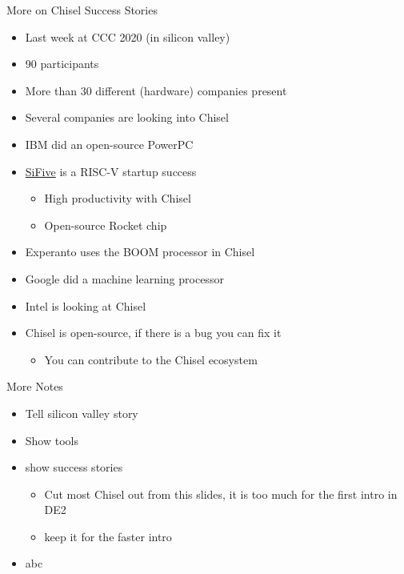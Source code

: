 \documentclass[xcolor=pdflatex,dvipsnames,table]{beamer}
\begin{document}
\begin{frame}[fragile]{More on Chisel Success Stories}
\begin{itemize}
\item Last week at CCC 2020 (in silicon valley)
\item 90 participants
\item More than 30 different (hardware) companies present
\item Several companies are looking into Chisel
\item IBM did an open-source PowerPC
\item \href{https://www.sifive.com/}{SiFive} is a RISC-V startup success
\begin{itemize}
\item High productivity with Chisel
\item Open-source Rocket chip
\end{itemize}
\item Experanto uses the BOOM processor in Chisel
\item Google did a machine learning processor
\item Intel is looking at Chisel
\item Chisel is open-source, if there is a bug you can fix it
\begin{itemize}
\item You can contribute to the Chisel ecosystem
\end{itemize}
\end{itemize}
\end{frame}

\begin{frame}[fragile]{More Notes}
\begin{itemize}
\item Tell silicon valley story
\item Show tools
\item show success stories
\begin{itemize}
\item Cut most Chisel out from this slides, it is too much for the first intro in DE2
\item keep it for the faster intro
\end{itemize}
\item abc
\end{itemize}
\end{frame}
\end{document}
